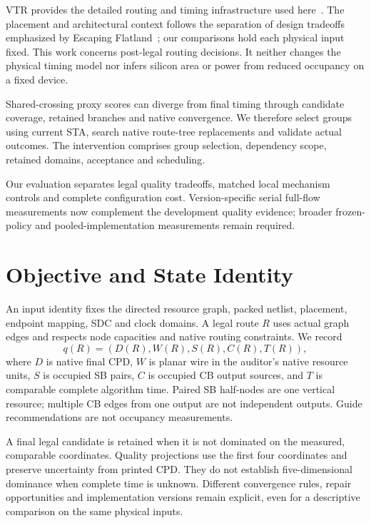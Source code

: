 \documentclass[conference,10pt]{IEEEtran}
\begin{document}
VTR provides the detailed routing and timing infrastructure used here~\cite{vtr9paper}. The placement and architectural context follows the separation of design tradeoffs emphasized by Escaping Flatland~\cite{flatland}; our comparisons hold each physical input fixed. This work concerns post-legal routing decisions. It neither changes the physical timing model nor infers silicon area or power from reduced occupancy on a fixed device.

Shared-crossing proxy scores can diverge from final timing through candidate coverage, retained branches and native convergence. We therefore select groups using current STA, search native route-tree replacements and validate actual outcomes. The intervention comprises group selection, dependency scope, retained domains, acceptance and scheduling.

Our evaluation separates legal quality tradeoffs, matched local mechanism controls and complete configuration cost. Version-specific serial full-flow measurements now complement the development quality evidence; broader frozen-policy and pooled-implementation measurements remain required.

\section{Objective and State Identity}
An input identity fixes the directed resource graph, packed netlist, placement, endpoint mapping, SDC and clock domains. A legal route $R$ uses actual graph edges and respects node capacities and native routing constraints. We record
\begin{equation}
 q(R)=(D(R),W(R),S(R),C(R),T(R)),
\end{equation}
where $D$ is native final CPD, $W$ is planar wire in the auditor's native resource units, $S$ is occupied SB pairs, $C$ is occupied CB output sources, and $T$ is comparable complete algorithm time. Paired SB half-nodes are one vertical resource; multiple CB edges from one output are not independent outputs. Guide recommendations are not occupancy measurements.

A final legal candidate is retained when it is not dominated on the measured, comparable coordinates. Quality projections use the first four coordinates and preserve uncertainty from printed CPD. They do not establish five-dimensional dominance when complete time is unknown. Different convergence rules, repair opportunities and implementation versions remain explicit, even for a descriptive comparison on the same physical inputs.
\end{document}
